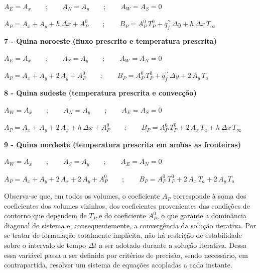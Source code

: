 \begin{center}
    $A_{E} = A_{x} \qquad ; \qquad A_{N} = A_{y} \qquad ; \qquad A_{W} = A_{S} = 0$
\end{center}
\begin{center}
    $A_{P} = A_{x} + A_{y} + h\,\Delta x + A_{P}^{0} \qquad ; \qquad B_{P} = A_{P}^{0}\,T_{P}^{0} + q^{\prime\prime}_{f}\,\Delta y + h\,\Delta x\,T_{\infty}$
\end{center}

\vspace{0.5cm}
\noindent\textbf{7 - Quina noroeste (fluxo prescrito e temperatura prescrita)}

\begin{center}
    $A_{E} = A_{x} \qquad ; \qquad A_{S} = A_{y} \qquad ; \qquad A_{W} = A_{N} = 0$
\end{center}
\begin{center}
    $A_{P} = A_{x} + A_{y} + 2\,A_{y} + A_{P}^{0} \qquad ; \qquad B_{P} = A_{P}^{0}\,T_{P}^{0} + q^{\prime\prime}_{f}\,\Delta y + 2\,A_{y}\,T_{a}$
\end{center}

\vspace{0.5cm}
\noindent\textbf{8 - Quina sudeste (temperatura prescrita e convecção)}

\begin{center}
    $A_{W} = A_{x} \qquad ; \qquad A_{N} = A_{y} \qquad ; \qquad A_{E} = A_{S} = 0$
\end{center}
\begin{center}
    $A_{P} = A_{x} + A_{y} + 2\,A_{x} + h\,\Delta x + A_{P}^{0} \qquad ; \qquad B_{P} = A_{P}^{0}\,T_{P}^{0} + 2\,A_{x}\,T_{a} + h\,\Delta x\,T_{\infty}$
\end{center}

\vspace{0.5cm}
\noindent\textbf{9 - Quina nordeste (temperatura prescrita em ambas as fronteiras)}

\begin{center}
    $A_{W} = A_{x} \qquad ; \qquad A_{S} = A_{y} \qquad ; \qquad A_{E} = A_{N} = 0$
\end{center}
\begin{center}
    $A_{P} = A_{x} + A_{y} + 2\,A_{x} + 2\,A_{y} + A_{P}^{0} \qquad ; \qquad B_{P} = A_{P}^{0}\,T_{P}^{0} + 2\,A_{x}\,T_{a} + 2\,A_{y}\,T_{a}$
\end{center}

\vspace{0.5cm}

Observa-se que, em todos os volumes, o coeficiente $A_{P}$ corresponde à soma dos coeficientes dos volumes vizinhos, dos coeficientes provenientes das condições de contorno que dependem de $T_{P}$ e do coeficiente $A_{P}^{0}$, o que garante a dominância diagonal do sistema e, consequentemente, a convergência da solução iterativa. Por se tratar de formulação totalmente implícita, não há restrição de estabilidade sobre o intervalo de tempo $\Delta t$ a ser adotado durante a solução iterativa. Dessa essa variável passa a ser definida por critérios de precisão, sendo necessário, em contrapartida, resolver um sistema de equações acopladas a cada instante.